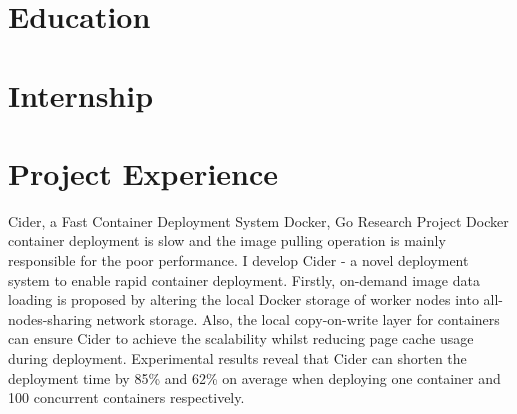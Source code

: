 \documentclass[11pt,a4paper]{moderncv}
\begin{document}
\maketitle

\section{Education}


\section{Internship}

\section{Project Experience}


{Cider, a Fast Container Deployment System}
{Docker, Go}
{Research Project}{}
{Docker container deployment is slow and the image pulling operation is mainly responsible for the poor performance. I develop Cider - a novel deployment system to enable rapid container deployment. Firstly, on-demand image data loading is proposed by altering the local Docker storage of worker nodes into all-nodes-sharing network storage. Also, the local copy-on-write layer for containers can ensure Cider to achieve the scalability whilst reducing page cache usage during deployment. Experimental results reveal that Cider can shorten the deployment time by 85\% and 62\% on average when deploying one container and 100 concurrent containers respectively.
}
\end{document}
